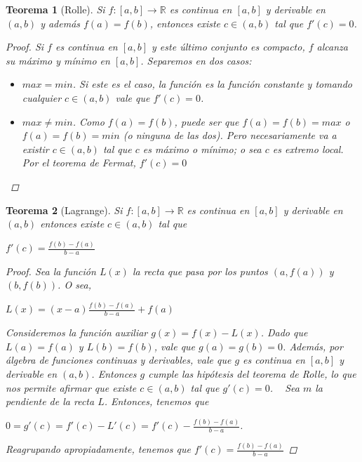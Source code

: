 \documentclass[]{article}
\newtheorem{teo}{Teorema}
\def\R{\mathbb{R}}
\begin{document}
\begin{teo}[Rolle]
	Si $f:[a,b]\to \R$ es continua en $[a,b]$ y derivable en $(a,b)$ y además $f(a) = f(b)$, entonces existe $c\in (a,b)$ tal que $f'(c)=0$.
	\begin{proof}
		Si $f$ es continua en $[a,b]$ y este último conjunto es compacto, $f$ alcanza su máximo y mínimo en $[a,b]$. Separemos en dos casos:
		\begin{itemize}
			\item $ max = min$. Si este es el caso, la función es la función constante y tomando cualquier $c\in (a,b)$ vale que $f'(c)=0$.\newline
			\item $ max \neq min$. Como $f(a) = f(b)$, puede ser que $f(a) = f(b) = max$ o $f(a) = f(b)=min$ (o ninguna de las dos). Pero necesariamente va a existir $c\in (a,b)$ tal que $c$ es máximo o mínimo; o sea $c$ es extremo local. Por el teorema de \textit{Fermat}, $f'(c)=0$
		\end{itemize}
	\end{proof}
\end{teo}

\begin{teo}[Lagrange]
	Si $f:[a,b]\to \R$ es continua en $[a,b]$ y derivable en $(a,b)$ entonces existe $c\in (a,b)$ tal que 
	\begin{center}
		$\displaystyle f'(c) = \frac{f(b)-f(a)}{b-a}$
	\end{center}
	\begin{proof}
		Sea la función $L(x)$ la recta que pasa por los puntos $(a,f(a))$ y $(b,f(b))$. O sea,
		\begin{center}
			$\displaystyle L(x) = (x-a)\frac{f(b)-f(a)}{b-a} + f(a)$
		\end{center}
		Consideremos la función auxiliar $g(x) = f(x) - L(x)$. Dado que $L(a) = f(a)$ y $L(b) = f(b)$, vale que $g(a) = g(b) = 0$. Además, por álgebra de funciones continuas y derivables, vale que $g$ es continua en $[a,b]$ y derivable en $(a,b)$. Entonces $g$ cumple las hipótesis del teorema de Rolle, lo que nos permite afirmar que existe $c\in (a,b)$ tal que $g'(c)=0$.\newline
		~\newline
		Sea $m$ la pendiente de la recta $L$. Entonces, tenemos que
		\begin{center}
			$0 = g'(c) = f'(c) - L'(c) = f'(c) - \displaystyle \frac{f(b)-f(a)}{b-a}$.
		\end{center}
		Reagrupando apropiadamente, tenemos que $\displaystyle f'(c) = \frac{f(b)-f(a)}{b-a}$
	\end{proof}
\end{teo}
\end{document}

